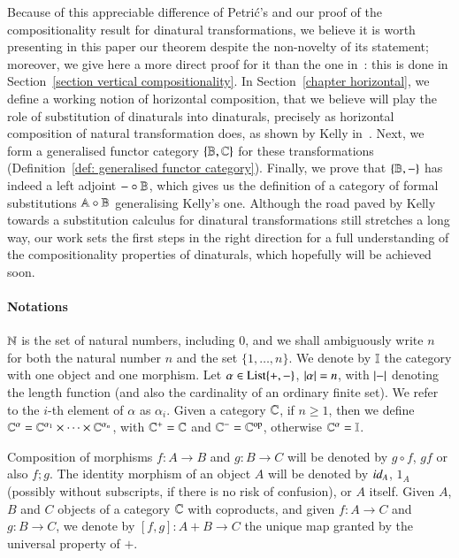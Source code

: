 Because of this appreciable difference of Petri\'c's and our proof of the compositionality result for dinatural transformations, we believe it is worth presenting in this paper our theorem despite the non-novelty of its statement; moreover, we give here a more direct proof for it than the one in~\cite{mccusker_compositionality_2018}: this is done in Section~\ref{section vertical compositionality}. In Section~\ref{chapter horizontal}, we define a working notion of horizontal composition, that we believe will play the role of substitution of dinaturals into dinaturals, precisely as horizontal composition of natural transformation does, as shown by Kelly in~\cite{kelly_many-variable_1972}. Next, we form a generalised functor category $\{ \mathbb B,\mathbb C\}$ for these transformations (Definition~\ref{def: generalised functor category}). Finally, we prove that $\{ \mathbb B,-\}$ has indeed a left adjoint $- \circ \mathbb B$, which gives us the definition of a category of formal substitutions $\mathbb A \circ \mathbb B$ generalising Kelly's one. Although the road paved by Kelly towards a substitution calculus for dinatural transformations still stretches a long way, our work sets the first steps in the right direction for a full understanding of the compositionality properties of dinaturals, which hopefully will be achieved soon.





\paragraph{Notations} 
$\mathbb N$ is the set of natural numbers, including 0, and we shall ambiguously write $n$ for both the natural number $n$ and the set $\{1,\dots,n\}$. We denote by $\mathbb I$ the category with one object and one morphism. Let $\alpha\in \mathrm{List}\{+,-\}$, $\lvert \alpha \rvert=n$, with $\lvert - \rvert$ denoting the length function (and also the cardinality of an ordinary finite set). We refer to the $i$-th element of $\alpha$ as $\alpha_i$. Given a category $\mathbb C$, if $n\ge 1$, then we define $\mathbb C^\alpha=\mathbb C^{\alpha_1} \times \dots \times \mathbb C^{\alpha_n}$, with $\mathbb C^+=\mathbb C$ and $\mathbb C^-=\mathbb C^{\text{op}}$, otherwise $\mathbb C^\alpha=\mathbb I$. 

Composition of morphisms $f \colon A \to B$ and $g \colon B \to C$ will be denoted by $g\circ f$, $gf$ or also $f;g$. The identity morphism of an object $A$ will be denoted by $\mathop{\textit{id}_{A}}$, $1_A$ (possibly without subscripts, if there is no risk of confusion), or $A$ itself. 
	Given $A$, $B$ and $C$ objects of a category $\mathbb C$ with coproducts, and given $f \colon A \to C$ and $g \colon B \to C$, we denote by $[f,g] \colon A + B \to C$ the unique map granted by the universal property of $+$.

